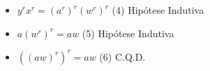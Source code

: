 \documentclass[a4paper,12pt]{article}
\begin{document}
\begin{enumerate}
\begin{itemize}
		 \item $ y^rx^r=(a^r)^r(w^r)^r$ \space\space\space\space\space\space\space\space\space\space\space\space\space\space\space\space\space\space 
		 (4) Hipótese Indutiva
		 
		 \item $a(w^r)^r = aw$ \space\space\space\space\space\space\space\space\space\space\space\space\space\space\space\space\space\space\space\space\space\space\space\space 
		 (5) Hipótese Indutiva \\
		
		 \item $((aw)^r)^r = aw$ \space\space\space\space\space\space\space\space\space\space\space\space\space\space\space\space\space\space\space\space\space\space (6) C.Q.D.
		 
		 
		 

		 
		 
			
\end{itemize}	
		

	
	
\end{enumerate}



\medskip
\end{document}
